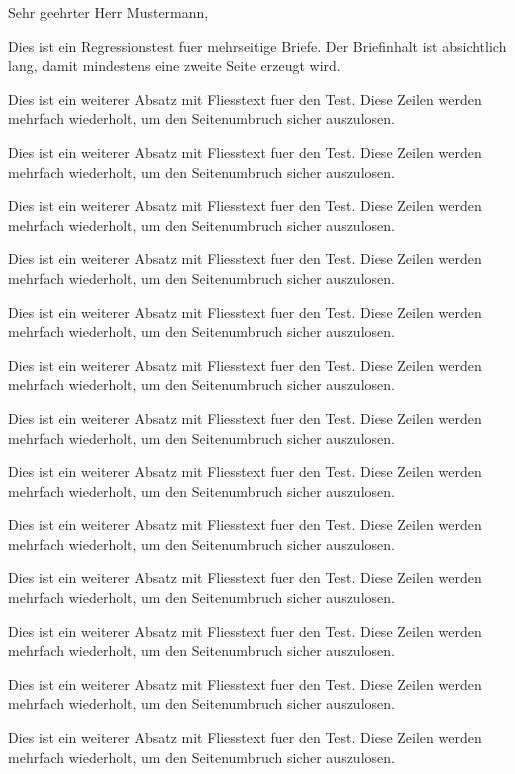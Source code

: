 \documentclass[basic]{../onlinebrief24}
\begin{document}
\begin{letter}{}
\opening{Sehr geehrter Herr Mustermann,}

Dies ist ein Regressionstest fuer mehrseitige Briefe. Der Briefinhalt ist absichtlich lang, damit mindestens eine zweite Seite erzeugt wird.

\par Dies ist ein weiterer Absatz mit Fliesstext fuer den Test. Diese Zeilen werden mehrfach wiederholt, um den Seitenumbruch sicher auszulosen.
\par Dies ist ein weiterer Absatz mit Fliesstext fuer den Test. Diese Zeilen werden mehrfach wiederholt, um den Seitenumbruch sicher auszulosen.
\par Dies ist ein weiterer Absatz mit Fliesstext fuer den Test. Diese Zeilen werden mehrfach wiederholt, um den Seitenumbruch sicher auszulosen.
\par Dies ist ein weiterer Absatz mit Fliesstext fuer den Test. Diese Zeilen werden mehrfach wiederholt, um den Seitenumbruch sicher auszulosen.
\par Dies ist ein weiterer Absatz mit Fliesstext fuer den Test. Diese Zeilen werden mehrfach wiederholt, um den Seitenumbruch sicher auszulosen.
\par Dies ist ein weiterer Absatz mit Fliesstext fuer den Test. Diese Zeilen werden mehrfach wiederholt, um den Seitenumbruch sicher auszulosen.
\par Dies ist ein weiterer Absatz mit Fliesstext fuer den Test. Diese Zeilen werden mehrfach wiederholt, um den Seitenumbruch sicher auszulosen.
\par Dies ist ein weiterer Absatz mit Fliesstext fuer den Test. Diese Zeilen werden mehrfach wiederholt, um den Seitenumbruch sicher auszulosen.
\par Dies ist ein weiterer Absatz mit Fliesstext fuer den Test. Diese Zeilen werden mehrfach wiederholt, um den Seitenumbruch sicher auszulosen.
\par Dies ist ein weiterer Absatz mit Fliesstext fuer den Test. Diese Zeilen werden mehrfach wiederholt, um den Seitenumbruch sicher auszulosen.
\par Dies ist ein weiterer Absatz mit Fliesstext fuer den Test. Diese Zeilen werden mehrfach wiederholt, um den Seitenumbruch sicher auszulosen.
\par Dies ist ein weiterer Absatz mit Fliesstext fuer den Test. Diese Zeilen werden mehrfach wiederholt, um den Seitenumbruch sicher auszulosen.
\par Dies ist ein weiterer Absatz mit Fliesstext fuer den Test. Diese Zeilen werden mehrfach wiederholt, um den Seitenumbruch sicher auszulosen.

\end{letter}
\end{document}
